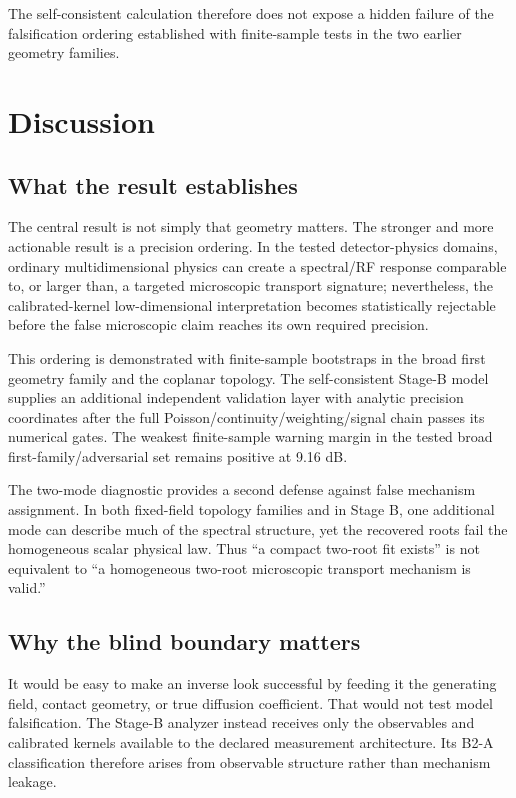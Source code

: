 \documentclass[11pt]{article}
\begin{document}
The self-consistent calculation therefore does not expose a hidden failure of the falsification ordering established with finite-sample tests in the two earlier geometry families.

\section{Discussion}

\subsection{What the result establishes}

The central result is not simply that geometry matters. The stronger and more actionable result is a precision ordering. In the tested detector-physics domains, ordinary multidimensional physics can create a spectral/RF response comparable to, or larger than, a targeted microscopic transport signature; nevertheless, the calibrated-kernel low-dimensional interpretation becomes statistically rejectable before the false microscopic claim reaches its own required precision.

This ordering is demonstrated with finite-sample bootstraps in the broad first geometry family and the coplanar topology. The self-consistent Stage-B model supplies an additional independent validation layer with analytic precision coordinates after the full Poisson/continuity/weighting/signal chain passes its numerical gates. The weakest finite-sample warning margin in the tested broad first-family/adversarial set remains positive at 9.16 dB.

The two-mode diagnostic provides a second defense against false mechanism assignment. In both fixed-field topology families and in Stage B, one additional mode can describe much of the spectral structure, yet the recovered roots fail the homogeneous scalar physical law. Thus ``a compact two-root fit exists'' is not equivalent to ``a homogeneous two-root microscopic transport mechanism is valid.''

\subsection{Why the blind boundary matters}

It would be easy to make an inverse look successful by feeding it the generating field, contact geometry, or true diffusion coefficient. That would not test model falsification. The Stage-B analyzer instead receives only the observables and calibrated kernels available to the declared measurement architecture. Its B2-A classification therefore arises from observable structure rather than mechanism leakage.
\end{document}
